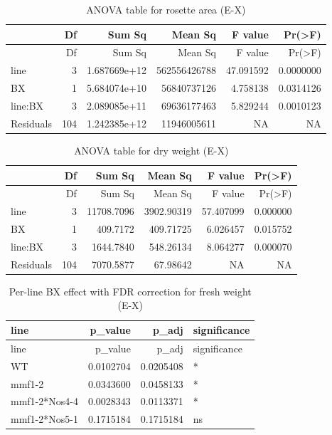 \documentclass[
  10pt,
]{article}
\begin{document}
\begin{longtable}[]{@{}lrrrrr@{}}
\caption{ANOVA table for rosette area (E-X)}\tabularnewline
\toprule\noalign{}
& Df & Sum Sq & Mean Sq & F value & Pr(\textgreater F) \\
\midrule\noalign{}
\endfirsthead
\toprule\noalign{}
& Df & Sum Sq & Mean Sq & F value & Pr(\textgreater F) \\
\midrule\noalign{}
\endhead
\bottomrule\noalign{}
\endlastfoot
line & 3 & 1.687669e+12 & 562556426788 & 47.091592 & 0.0000000 \\
BX & 1 & 5.684074e+10 & 56840737126 & 4.758138 & 0.0314126 \\
line:BX & 3 & 2.089085e+11 & 69636177463 & 5.829244 & 0.0010123 \\
Residuals & 104 & 1.242385e+12 & 11946005611 & NA & NA \\
\end{longtable}

\begin{longtable}[]{@{}lrrrrr@{}}
\caption{ANOVA table for dry weight (E-X)}\tabularnewline
\toprule\noalign{}
& Df & Sum Sq & Mean Sq & F value & Pr(\textgreater F) \\
\midrule\noalign{}
\endfirsthead
\toprule\noalign{}
& Df & Sum Sq & Mean Sq & F value & Pr(\textgreater F) \\
\midrule\noalign{}
\endhead
\bottomrule\noalign{}
\endlastfoot
line & 3 & 11708.7096 & 3902.90319 & 57.407099 & 0.000000 \\
BX & 1 & 409.7172 & 409.71725 & 6.026457 & 0.015752 \\
line:BX & 3 & 1644.7840 & 548.26134 & 8.064277 & 0.000070 \\
Residuals & 104 & 7070.5877 & 67.98642 & NA & NA \\
\end{longtable}

\begin{longtable}[]{@{}lrrl@{}}
\caption{Per-line BX effect with FDR correction for fresh weight
(E-X)}\tabularnewline
\toprule\noalign{}
line & p\_value & p\_adj & significance \\
\midrule\noalign{}
\endfirsthead
\toprule\noalign{}
line & p\_value & p\_adj & significance \\
\midrule\noalign{}
\endhead
\bottomrule\noalign{}
\endlastfoot
WT & 0.0102704 & 0.0205408 & * \\
mmf1-2 & 0.0343600 & 0.0458133 & * \\
mmf1-2*Nos4-4 & 0.0028343 & 0.0113371 & * \\
mmf1-2*Nos5-1 & 0.1715184 & 0.1715184 & ns \\
\end{longtable}
\end{document}
